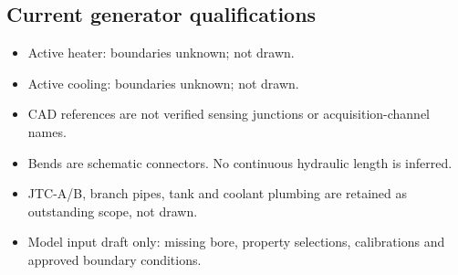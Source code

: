 \documentclass[11pt]{article}
\begin{document}
\subsection*{Current generator qualifications}
\begin{itemize}
\item Active heater: boundaries unknown; not drawn.
\item Active cooling: boundaries unknown; not drawn.
\item CAD references are not verified sensing junctions or acquisition-channel names.
\item Bends are schematic connectors. No continuous hydraulic length is inferred.
\item JTC-A/B, branch pipes, tank and coolant plumbing are retained as outstanding scope, not drawn.
\item Model input draft only: missing bore, property selections, calibrations and approved boundary conditions.
\end{itemize}
\clearpage\thispagestyle{empty}
\end{document}

